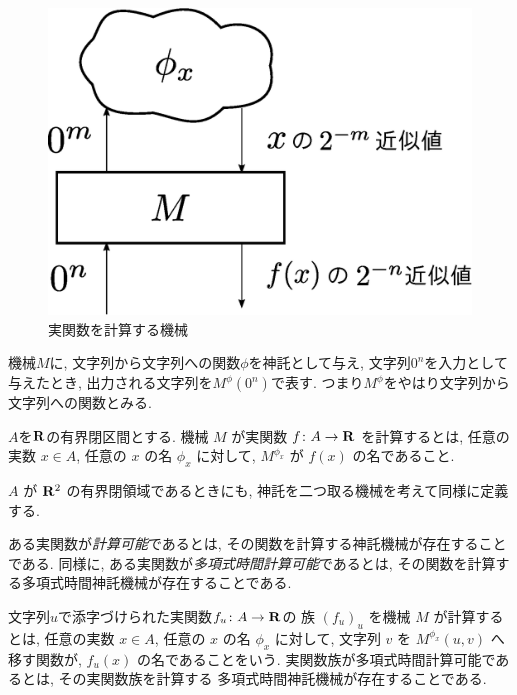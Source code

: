  \begin{figure}
  \begin{center}
   \includegraphics[height=0.15\textheight]{image/model-of-function.eps}
  \end{center}
  \caption{実関数を計算する機械}
  \label{fig:model-of-function}
 \end{figure}

機械$M$に, 
文字列から文字列への関数$\phi$を神託として与え, 
文字列$0 ^n$を入力として与えたとき, 
出力される文字列を$M ^\phi (0 ^n)$で表す. 
つまり$M ^\phi$をやはり文字列から文字列への関数とみる. 

\begin{definition}
$A$を$\mathbf R$の有界閉区間とする. 
機械 $M$ が実関数 $f \colon A \to \mathbf R$ を計算するとは,
任意の実数 $x \in A$, 任意の $x$ の名 $\phi_x$ に対して,
$M^{\phi_x}$ が $f(x)$ の名であること.
\end{definition}

$A$ が $\mathbf R ^2$ の有界閉領域であるときにも, 
神託を二つ取る機械を考えて同様に定義する. 


 ある実関数が\emph{計算可能}であるとは, その関数を計算する神託機械が存在することである.
 同様に, ある実関数が\emph{多項式時間計算可能}であるとは, その関数を計算する多項式時間神託機械が存在することである.

文字列$u$で添字づけられた実関数$f _u \colon A \to \mathbf R$の
族 $(f_u)_u$ を機械 $M$ が計算するとは,
任意の実数 $x \in A$, 任意の $x$ の名 $\phi_x$ に対して,
文字列 $v$ を $M ^{\phi _x} (u, v)$ へ移す関数が, 
$f _u (x)$ の名であることをいう.
 実関数族が多項式時間計算可能であるとは, その実関数族を計算する
 多項式時間神託機械が存在することである.


